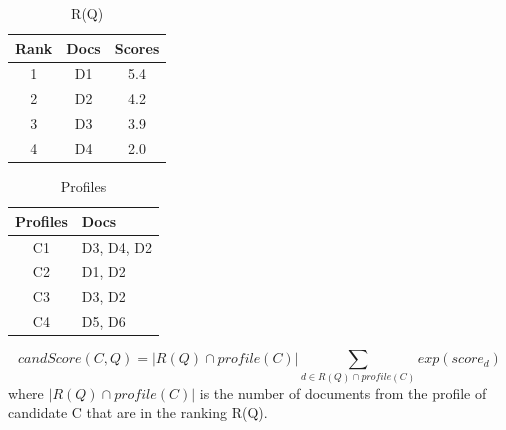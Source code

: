 \begin{table}
\centering
\begin{tabular}{|c|c|c|}
\hline \textbf{Rank} & \textbf{Docs} & \textbf{Scores}\\
\hline 1 & D1 & 5.4 \\
\hline 2 & D2 & 4.2\\
\hline 3 & D3 & 3.9 \\
\hline 4 & D4 & 2.0 \\  
\hline
\end{tabular}
\caption{R(Q)} \label{table:ranking}
\end{table}
\quad
\begin{table}
\centering
\begin{tabular}{|c|l|}
\hline \textbf{Profiles} & \textbf{Docs}\\
\hline C1 & D3, D4, D2 \\
\hline C2 & D1, D2 \\
\hline C3 & D3, D2 \\
\hline C4 & D5, D6 \\  
\hline
\end{tabular}
\caption{Profiles} \label{table:profiles}
\end{table}

\[
candScore(C,Q) = |R(Q) \cap profile(C)| \sum_{d \in R(Q) \cap profile(C)} exp(score_d)
\]
where $|R(Q) \cap profile(C)|$ is the number of documents from the profile of candidate C that are in the ranking R(Q).














